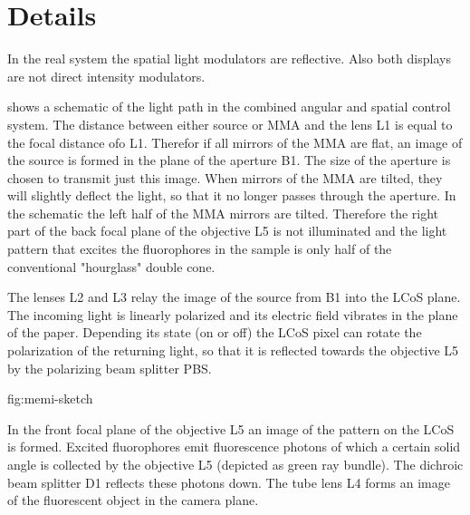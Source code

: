 \section{Details}

In the real system the spatial light modulators are reflective. 
Also both displays are not direct intensity modulators.


 shows a schematic of the light path in
the combined angular and spatial control system. The distance between
either source or MMA and the lens L1 is equal to the focal distance ofo
L1. Therefor if all mirrors of the MMA are flat, an image of the
source is formed in the plane of the aperture B1. The size of the
aperture is chosen to transmit just this image. When mirrors of the
MMA are tilted, they will slightly deflect the light, so that it no
longer passes through the aperture.  In the schematic the left half of
the MMA mirrors are tilted. Therefore the right part of the back focal
plane of the objective L5 is not illuminated and the light pattern
that excites the fluorophores in the sample is only half of the
conventional "hourglass" double cone.

The lenses L2 and L3 relay the image of the source from B1 into the
LCoS plane.  The incoming light is linearly polarized and its electric
field vibrates in the plane of the paper. Depending its state (on or
off) the LCoS pixel can rotate the polarization of the returning
light, so that it is reflected towards the objective L5 by the
polarizing beam splitter PBS.

fig:memi-sketch


In the front focal plane of the objective L5 an image of the pattern
on the LCoS is formed. Excited fluorophores emit fluorescence photons
of which a certain solid angle is collected by the objective L5
(depicted as green ray bundle). The dichroic beam splitter D1 reflects
these photons down. The tube lens L4 forms an image of the fluorescent
object in the camera plane.





